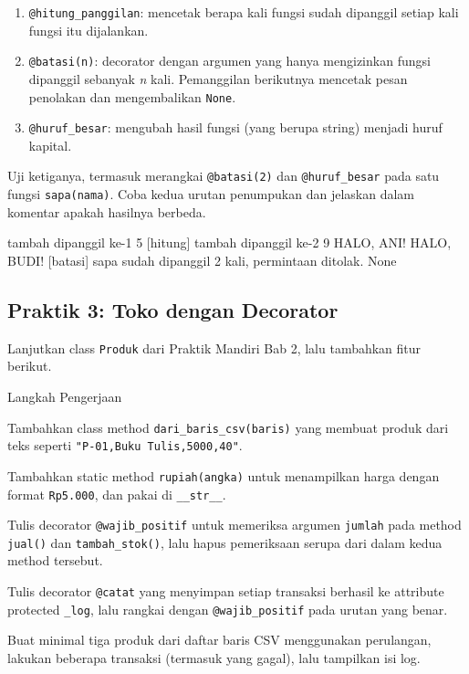 \begin{enumerate}
  \item \texttt{@hitung\_panggilan}: mencetak berapa kali fungsi sudah dipanggil setiap kali fungsi itu dijalankan.
  \item \texttt{@batasi(n)}: decorator dengan argumen yang hanya mengizinkan fungsi dipanggil sebanyak \emph{n} kali. Pemanggilan berikutnya mencetak pesan penolakan dan mengembalikan \texttt{None}.
  \item \texttt{@huruf\_besar}: mengubah hasil fungsi (yang berupa string) menjadi huruf kapital.
\end{enumerate}

Uji ketiganya, termasuk merangkai \texttt{@batasi(2)} dan \texttt{@huruf\_besar} pada satu fungsi \texttt{sapa(nama)}. Coba kedua urutan penumpukan dan jelaskan dalam komentar apakah hasilnya berbeda.

\begin{keluaran} tambah dipanggil ke-1
5
[hitung] tambah dipanggil ke-2
9
HALO, ANI!
HALO, BUDI!
[batasi] sapa sudah dipanggil 2 kali, permintaan ditolak.
None
\end{keluaran}

\subsection{Praktik 3: Toko dengan Decorator}

Lanjutkan class \texttt{Produk} dari Praktik Mandiri Bab 2, lalu tambahkan fitur berikut.

\begin{langkah}{Langkah Pengerjaan}
  \item Tambahkan class method \texttt{dari\_baris\_csv(baris)} yang membuat produk dari teks seperti \texttt{"P-01,Buku Tulis,5000,40"}.
  \item Tambahkan static method \texttt{rupiah(angka)} untuk menampilkan harga dengan format \texttt{Rp5.000}, dan pakai di \texttt{\_\_str\_\_}.
  \item Tulis decorator \texttt{@wajib\_positif} untuk memeriksa argumen \texttt{jumlah} pada method \texttt{jual()} dan \texttt{tambah\_stok()}, lalu hapus pemeriksaan serupa dari dalam kedua method tersebut.
  \item Tulis decorator \texttt{@catat} yang menyimpan setiap transaksi berhasil ke attribute protected \texttt{\_log}, lalu rangkai dengan \texttt{@wajib\_positif} pada urutan yang benar.
  \item Buat minimal tiga produk dari daftar baris CSV menggunakan perulangan, lakukan beberapa transaksi (termasuk yang gagal), lalu tampilkan isi log.
\end{langkah}

